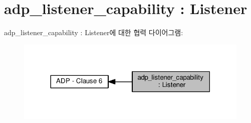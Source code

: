 \hypertarget{group__adp__listener__capability}{}\section{adp\+\_\+listener\+\_\+capability \+: Listener}
\label{group__adp__listener__capability}
adp\+\_\+listener\+\_\+capability \+: Listener에 대한 협력 다이어그램\+:
\nopagebreak
\begin{figure}[H]
\begin{center}
\leavevmode
\includegraphics[width=318pt]{group__adp__listener__capability}
\end{center}
\end{figure}
